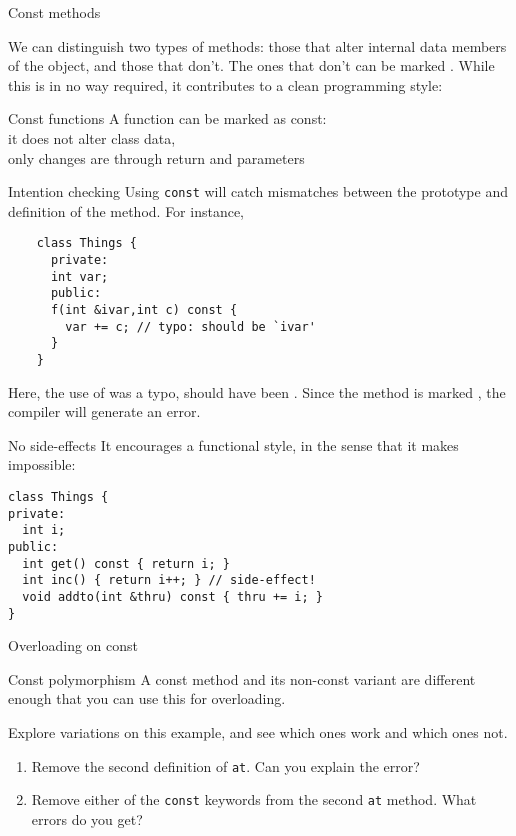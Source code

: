 {Const methods}

We can distinguish two types of methods: those that alter internal
data members of the object, and those that don't. The ones that don't
can be marked .
While this is in no way required, it contributes to a clean
programming style:

\begin{slide}{Const functions}
  \label{sl:const-function}
  A function can be marked as const:\\
  it does not alter class data,\\
  only changes are through return and parameters
\end{slide}

\begin{block}{Intention checking}
  Using \lstinline{const} will catch mismatches between the prototype
  and definition of the method. For instance,
  \begin{lstlisting}
    class Things {
      private:
      int var;
      public:
      f(int &ivar,int c) const {
        var += c; // typo: should be `ivar'
      }
    }
  \end{lstlisting}
\end{block}

Here, the use of  was a typo, should have been . Since
the method is marked , the compiler will generate an error.

\begin{block}{No side-effects}
  \label{sl:const-sideeffect}
  It encourages a functional style, in the sense that it makes
   impossible:
\begin{lstlisting}
class Things {
private:
  int i;
public:
  int get() const { return i; }
  int inc() { return i++; } // side-effect!
  void addto(int &thru) const { thru += i; }
}
\end{lstlisting}
\end{block}

 {Overloading on const}
\label{sec:const-overload}

\begin{block}{Const polymorphism}
  \label{sl:const-poly}
  A const method and its non-const variant are different enough that you
  can use this for overloading.
\end{block}

\begin{exercise}
  \label{ex:const-poly}
  Explore variations on this example, and see which ones work and
  which ones not.
  \begin{enumerate}
  \item Remove the second definition of \lstinline{at}. Can you
    explain the error?
  \item
    Remove either of the \lstinline{const} keywords from the second
    \lstinline{at} method. What errors do you get?
  \end{enumerate}
\end{exercise}

